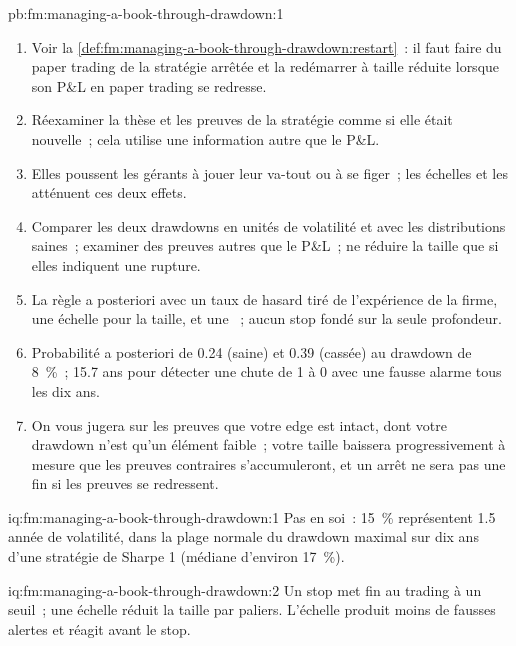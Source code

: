 \begin{solution}{pb:fm:managing-a-book-through-drawdown:1}
\begin{enumerate}
\item Voir la \cref{def:fm:managing-a-book-through-drawdown:restart}~: il faut faire du paper trading de la stratégie arrêtée et la redémarrer à taille réduite lorsque son P\&L
en paper trading se redresse.
\item Réexaminer la thèse et les preuves de la stratégie comme si elle était nouvelle~; cela utilise une information autre que le P\&L.
\item Elles poussent les gérants à jouer leur va-tout ou à se figer~; les échelles et les  atténuent ces deux effets.
\item Comparer les deux drawdowns en unités de volatilité et avec les distributions saines~; examiner des preuves autres que le P\&L~; ne réduire la taille que si elles
indiquent une rupture.
\item La règle a posteriori avec un taux de hasard tiré de l'expérience de la firme, une échelle pour la taille, et une ~; aucun stop fondé sur la seule profondeur.
\item Probabilité a posteriori de 0.24 (saine) et 0.39 (cassée) au drawdown de 8~\%~; 15.7 ans pour détecter une chute de 1 à 0 avec une fausse alarme tous les dix ans.
\item On vous jugera sur les preuves que votre edge est intact, dont votre drawdown n'est qu'un élément faible~; votre taille baissera progressivement à mesure que
les preuves contraires s'accumuleront, et un arrêt ne sera pas une fin si les preuves se redressent.
\end{enumerate}
\end{solution}

\begin{solution}{iq:fm:managing-a-book-through-drawdown:1}
Pas en soi~: 15~\% représentent 1.5 année de volatilité, dans la plage normale du drawdown maximal sur dix ans d'une stratégie de Sharpe 1 (médiane d'environ 17~\%).
\end{solution}

\begin{solution}{iq:fm:managing-a-book-through-drawdown:2}
Un stop met fin au trading à un seuil~; une échelle réduit la taille par paliers. L'échelle produit moins de fausses alertes et réagit avant le stop.
\end{solution}

